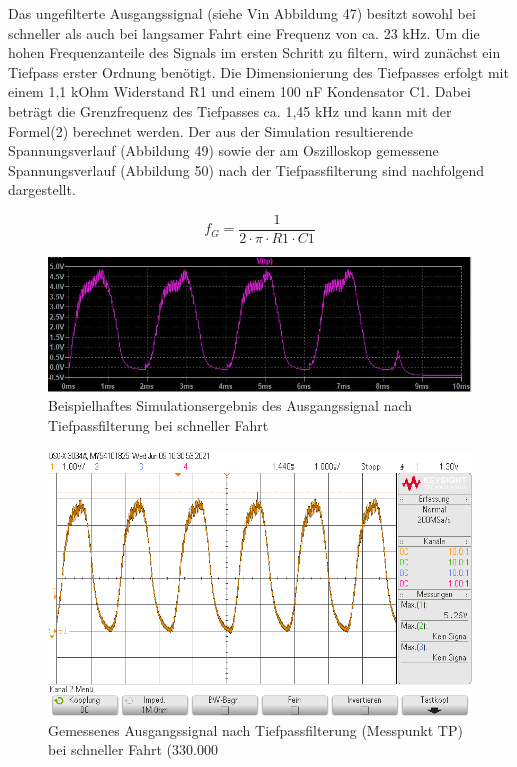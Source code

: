 Das ungefilterte Ausgangssignal (siehe Vin Abbildung 47) besitzt sowohl bei schneller als auch bei langsamer Fahrt eine Frequenz von ca. 23 kHz. Um die hohen Frequenzanteile des Signals im ersten Schritt zu filtern, wird zunächst ein Tiefpass erster Ordnung benötigt. Die Dimensionierung des Tiefpasses erfolgt mit einem 1,1 kOhm Widerstand R1 und einem 100 nF Kondensator C1. Dabei beträgt die Grenzfrequenz des Tiefpasses ca. 1,45 kHz und kann mit der Formel(2) berechnet werden. Der aus der Simulation resultierende Spannungsverlauf (Abbildung 49) sowie der am Oszilloskop gemessene Spannungsverlauf (Abbildung 50) nach der Tiefpassfilterung sind nachfolgend dargestellt.\vspace{11pt}

\begin{equation}\label{eq1}
f_G = \frac{ 1 }{2 \cdot \pi \cdot R1\cdot C1 }
\end{equation}

\begin{figure}[H] %
\includegraphics[width=.90\textwidth]{sec4/images/Spannungsverlauf_TP} 
\centering
\captionsetup{width=.95\textwidth}
\caption[Spannungsverlauf\_TP]{Beispielhaftes Simulationsergebnis des Ausgangssignal nach Tiefpassfilterung bei schneller Fahrt}\centering
\label{fig:SpannungsverlaufTP}
\end{figure}

\begin{figure}[H] %
\includegraphics[width=.90\textwidth]{sec4/images/TP} 
\centering
\captionsetup{width=.95\textwidth}
\caption[TP]{Gemessenes Ausgangssignal nach Tiefpassfilterung (Messpunkt TP) bei schneller Fahrt (330.000}\centering
\label{fig:SpannungsverlaufTP}
\end{figure}


